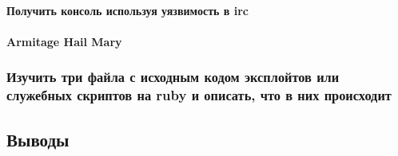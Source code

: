 \documentclass[a4paper, 12pt]{article}		%
\begin{document}
\paragraph{Получить консоль используя уязвимость в irc}

\paragraph{Armitage Hail Mary}

\subsubsection{Изучить три файла с исходным кодом эксплойтов или служебных скриптов на ruby и описать, что в них происходит}

\subsection{Выводы}
\end{document}
